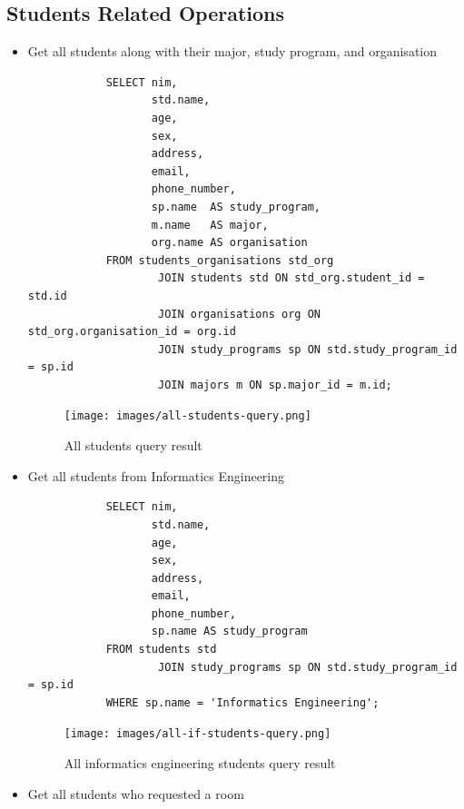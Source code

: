 \documentclass[12pt,titlepage]{article}
\begin{document}
\subsection{Students Related Operations}
\begin{itemize}
    \item {
        Get all students along with their major, study program, and organisation

        \begin{verbatim}
            SELECT nim,
                   std.name,
                   age,
                   sex,
                   address,
                   email,
                   phone_number,
                   sp.name  AS study_program,
                   m.name   AS major,
                   org.name AS organisation
            FROM students_organisations std_org
                    JOIN students std ON std_org.student_id = std.id
                    JOIN organisations org ON std_org.organisation_id = org.id
                    JOIN study_programs sp ON std.study_program_id = sp.id
                    JOIN majors m ON sp.major_id = m.id;
        \end{verbatim}

        \begin{figure}[h]
            \centering
            \texttt{[image: images/all-students-query.png]}
            \caption{All students query result}
        \end{figure}
    }
    \pagebreak
    \item {
        Get all students from Informatics Engineering

        \begin{verbatim}
            SELECT nim,
                   std.name,
                   age,
                   sex,
                   address,
                   email,
                   phone_number,
                   sp.name AS study_program
            FROM students std
                    JOIN study_programs sp ON std.study_program_id = sp.id
            WHERE sp.name = 'Informatics Engineering';
        \end{verbatim}

        \begin{figure}[h]
            \centering
            \texttt{[image: images/all-if-students-query.png]}
            \caption{All informatics engineering students query result}
        \end{figure}
    }
    \item {
        Get all students who requested a room

}
\end{itemize}
\end{document}
